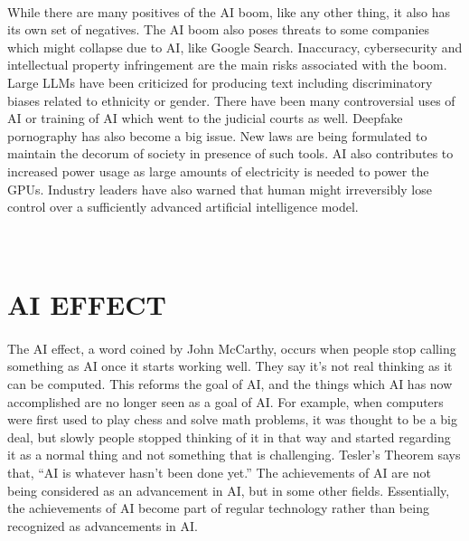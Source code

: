 \documentclass{article}
\begin{document}
\paragraph{}
	While there are many positives of the AI boom, like any other thing, it also has its own set of negatives.
	The AI boom also poses threats to some companies which might collapse due to AI, like Google Search.
	Inaccuracy, cybersecurity and intellectual property infringement are the main risks associated with the boom.
	Large LLMs have been criticized for producing text including discriminatory biases related to ethnicity or gender.
	There have been many controversial uses of AI or training of AI which went to the judicial courts as well.
	Deepfake pornography has also become a big issue.
	New laws are being formulated to maintain the decorum of society in presence of such tools.
	AI also contributes to increased power usage as large amounts of electricity is needed to power the GPUs.
	Industry leaders have also warned that human might irreversibly lose control over a sufficiently advanced artificial intelligence model. \\ \\ \\ 




 \section{AI EFFECT} \cite{ai_effect} 

\paragraph{}
	The AI effect, a word coined by John McCarthy, occurs when people stop calling something as AI once it starts working well. 
	They say it's not real thinking as it can be computed. 
	This reforms the goal of AI, and the things which AI has now accomplished are no longer seen as a goal of AI.
	For example, when computers were first used to play chess and solve math problems, it was thought to be a big deal, but slowly people stopped thinking of it in that way and started regarding it as a normal thing and not something that is challenging. 
	Tesler’s Theorem says that, “AI is whatever hasn’t been done yet.”
	The achievements of AI are not being considered as an advancement in AI, but in some other fields.
	Essentially, the achievements of AI become part of regular technology rather than being recognized as advancements in AI.
\end{document}
